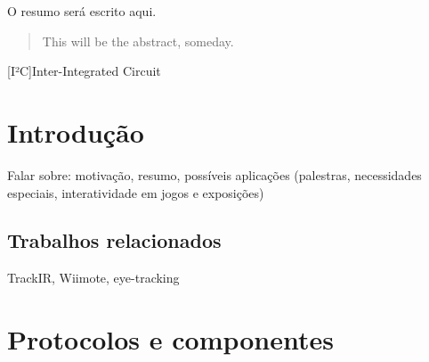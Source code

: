 \documentclass[brazil,pagestart=firstchapter]{abnt}
\begin{document}
\begin{resumo}
O resumo será escrito aqui.
\end{resumo}

\begin{abstract}
This will be the abstract, someday.
\end{abstract}


\listoffigures





\begin{acronym}[EEPROM]



[I²C]{Inter-Integrated Circuit}



\end{acronym}


\tableofcontents


\chapter{Introdução\label{cap:introducao}}

Falar sobre: motivação, resumo, possíveis aplicações (palestras,
necessidades especiais, interatividade em jogos e exposições)

\section{Trabalhos relacionados\label{sec:trabalhos_relacionados}}

TrackIR, Wiimote, eye-tracking


\chapter{Protocolos e componentes\label{cap:protocolos_e_componentes}}
\end{document}
